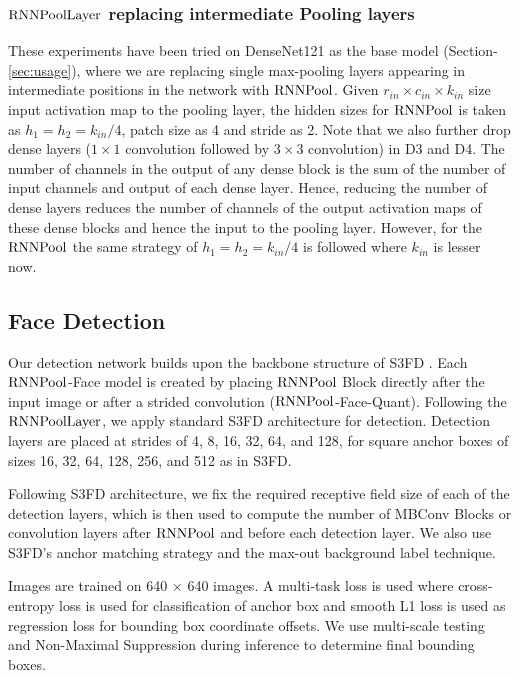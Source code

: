 \documentclass[10pt]{article}
\newcommand{\rpool}{\ensuremath{{\rm RNNPool}}\xspace}
\newcommand{\rpoollayer}{\ensuremath{{\rm RNNPoolLayer}}\xspace}
\begin{document}
\subsubsection{\rpoollayer replacing intermediate Pooling layers}

These experiments have been tried on DenseNet121 as the base model (Section-\ref{sec:usage}), where we are replacing single max-pooling layers appearing in intermediate positions in the network with \rpool. Given $r_{in} \times c_{in} \times k_{in}$ size input activation map to the pooling layer, the hidden sizes for \rpool is taken as $h_1=h_2=k_{in}/4$, patch size as 4 and stride as 2. Note that we also further drop dense layers ($1 \times 1$ convolution followed by $3 \times 3$ convolution) in D3 and D4. The number of channels in the output of any dense block is the sum of the number of input channels and output of each dense layer. Hence, reducing the number of dense layers reduces the number of channels of the output activation maps of these dense blocks and hence the input to the pooling layer. However, for the \rpool the same strategy of $h_1=h_2=k_{in}/4$ is followed where $k_{in}$ is lesser now.





\subsection{Face Detection}
\label{sec:fdmodels}

Our detection network builds upon the backbone structure of S3FD \cite{zhang2017s3fd}. Each \rpool-Face model is created by placing \rpool Block directly after the input image or after a strided convolution (\rpool-Face-Quant). Following the \rpoollayer, we apply standard S3FD architecture for detection. Detection layers are placed at strides of 4, 8, 16, 32, 64, and 128, for square anchor boxes of sizes 16, 32, 64, 128, 256, and 512 as in S3FD. 

Following S3FD architecture, we fix the required receptive field size of each of the detection layers, which is then used to compute the number of MBConv Blocks or convolution layers after \rpool and before each detection layer. We also use S3FD's anchor matching strategy and the max-out background label technique. 

Images are trained on 640 $\times$ 640 images. A multi-task loss is used where cross-entropy loss is used for classification of anchor box and smooth L1 loss is used as regression loss for bounding box coordinate offsets. We use multi-scale testing and Non-Maximal Suppression during inference to determine final bounding boxes.
\end{document}
